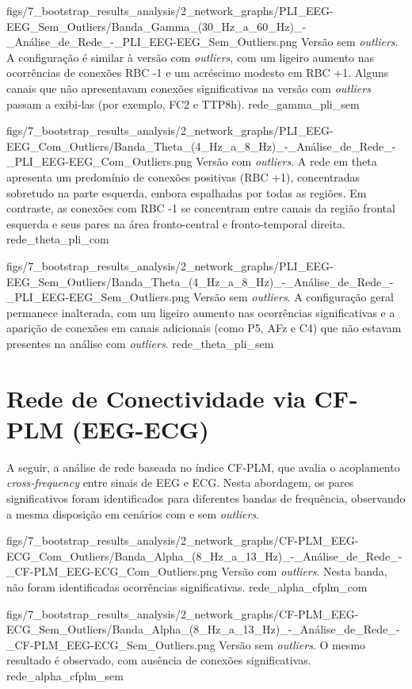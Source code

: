 \smallfigure
{figs/7_bootstrap_results_analysis/2_network_graphs/PLI_EEG-EEG_Sem_Outliers/Banda_Gamma_(30_Hz_a_60_Hz)_-_Análise_de_Rede_-_PLI_EEG-EEG_Sem_Outliers.png}
{Versão sem \textit{outliers}. A configuração é similar à versão com \textit{outliers}, com um ligeiro aumento nas ocorrências de conexões RBC -1 e um acréscimo modesto em RBC +1. Alguns canais que não apresentavam conexões significativas na versão com \textit{outliers} passam a exibi-las (por exemplo, FC2 e TTP8h).}
{rede_gamma_pli_sem}

\smallfigure
{figs/7_bootstrap_results_analysis/2_network_graphs/PLI_EEG-EEG_Com_Outliers/Banda_Theta_(4_Hz_a_8_Hz)_-_Análise_de_Rede_-_PLI_EEG-EEG_Com_Outliers.png}
{Versão com \textit{outliers}. A rede em theta apresenta um predomínio de conexões positivas (RBC +1), concentradas sobretudo na parte esquerda, embora espalhadas por todas as regiões. Em contraste, as conexões com RBC -1 se concentram entre canais da região frontal esquerda e seus pares na área fronto-central e fronto-temporal direita.}
{rede_theta_pli_com}

\smallfigure
{figs/7_bootstrap_results_analysis/2_network_graphs/PLI_EEG-EEG_Sem_Outliers/Banda_Theta_(4_Hz_a_8_Hz)_-_Análise_de_Rede_-_PLI_EEG-EEG_Sem_Outliers.png}
{Versão sem \textit{outliers}. A configuração geral permanece inalterada, com um ligeiro aumento nas ocorrências significativas e a aparição de conexões em canais adicionais (como P5, AFz e C4) que não estavam presentes na análise com \textit{outliers}.}
{rede_theta_pli_sem}


\section{Rede de Conectividade via CF‐PLM (EEG-ECG)}
A seguir, a análise de rede baseada no índice CF‐PLM, que avalia o acoplamento \emph{cross‐frequency} entre sinais de EEG e ECG. Nesta abordagem, os pares significativos foram identificados para diferentes bandas de frequência, observando a mesma disposição em cenários com e sem \textit{outliers}.

\smallfigure
{figs/7_bootstrap_results_analysis/2_network_graphs/CF-PLM_EEG-ECG_Com_Outliers/Banda_Alpha_(8_Hz_a_13_Hz)_-_Análise_de_Rede_-_CF-PLM_EEG-ECG_Com_Outliers.png}
{Versão com \textit{outliers}. Nesta banda, não foram identificadas ocorrências significativas.}
{rede_alpha_cfplm_com}

\smallfigure
{figs/7_bootstrap_results_analysis/2_network_graphs/CF-PLM_EEG-ECG_Sem_Outliers/Banda_Alpha_(8_Hz_a_13_Hz)_-_Análise_de_Rede_-_CF-PLM_EEG-ECG_Sem_Outliers.png}
{Versão sem \textit{outliers}. O mesmo resultado é observado, com ausência de conexões significativas.}
{rede_alpha_cfplm_sem}

